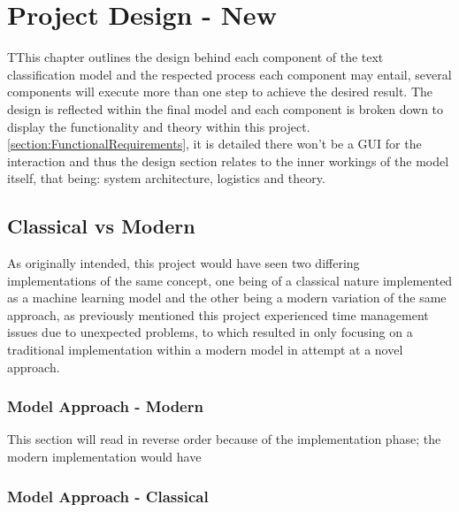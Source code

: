 \chapter{Project Design - New}

TThis chapter outlines the design behind each component of the text classification model and the respected process each component may entail, several components will execute more than one step to achieve the desired result. The design is reflected within the final model and each component is broken down to display the functionality and theory within this project. \ref{section:FunctionalRequirements}, it is detailed there won’t be a GUI for the interaction and thus the design section relates to the inner workings of the model itself, that being: system architecture, logistics and theory.

\section{Classical vs Modern}

As originally intended, this project would have seen two differing implementations of the same concept, one being of a classical nature implemented as a machine learning model and the other being a modern variation of the same approach, as previously mentioned this project experienced time management issues due to unexpected problems, to which resulted in only focusing on a traditional implementation within a modern model in attempt at a novel approach.



\subsection{Model Approach - Modern}

This section will read in reverse order because of the implementation phase; the modern implementation would have

\subsection{Model Approach - Classical}
